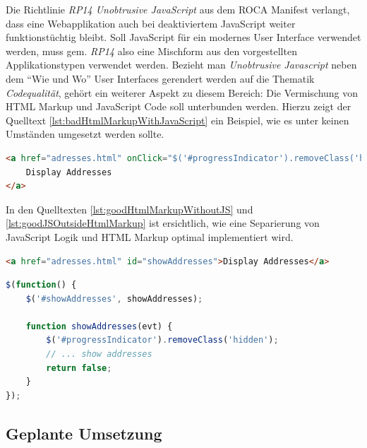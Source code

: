 Die Richtlinie \emph{RP14 Unobtrusive JavaScript} aus dem ROCA Manifest verlangt, dass eine Webapplikation auch bei deaktiviertem JavaScript weiter funktionstüchtig bleibt. Soll JavaScript für ein modernes User Interface verwendet werden, muss gem. \emph{RP14} also eine Mischform aus den vorgestellten Applikationstypen verwendet werden.
\newline\newline
Bezieht man \emph{Unobtrusive Javascript} neben dem ``Wie und Wo'' User Interfaces gerendert werden auf die Thematik \emph{Codequalität}, gehört ein weiterer Aspekt zu diesem Bereich: Die Vermischung von HTML Markup und JavaScript Code soll unterbunden werden. Hierzu zeigt der Quelltext \ref{lst:badHtmlMarkupWithJavaScript} ein Beispiel, wie es unter keinen Umständen umgesetzt werden sollte.

\begin{lstlisting}[language=HTML, caption={Beispiel einer Vermischung von HTML Markup und JavaScript}, label={lst:badHtmlMarkupWithJavaScript}]
<a href="adresses.html" onClick="$('#progressIndicator').removeClass('hidden');showAddresses();return false;">
	Display Addresses
</a>
\end{lstlisting}

In den Quelltexten \ref{lst:goodHtmlMarkupWithoutJS} und \ref{lst:goodJSOutsideHtmlMarkup} ist ersichtlich, wie eine Separierung von JavaScript Logik und HTML Markup optimal implementiert wird.

\begin{lstlisting}[language=HTML, caption={Beispiel eines sauberen HTML Markups ohne JavaScript}, label={lst:goodHtmlMarkupWithoutJS}]
<a href="adresses.html" id="showAddresses">Display Addresses</a>
\end{lstlisting}

\begin{lstlisting}[language=JavaScript, caption={Beispiel Event-Handler in ausgelagerter JavaScript Datei}, label={lst:goodJSOutsideHtmlMarkup}]
$(function() {
	$('#showAddresses', showAddresses);

	function showAddresses(evt) {
		$('#progressIndicator').removeClass('hidden');
		// ... show addresses
		return false;
	}
});
\end{lstlisting}


\subsection*{Geplante Umsetzung}

